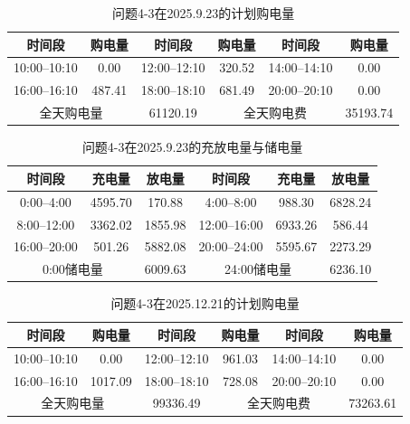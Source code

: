 \documentclass[UTF8]{ctexart}
\begin{document}
    \begin{table}[htbp]
        \centering
        \caption{问题4-3在2025.9.23的计划购电量}
        \label{tab:q43_tenminute_0923}
        \begin{tabular}{cccccc}
            \toprule
            时间段 & 购电量 & 时间段 & 购电量 & 时间段 & 购电量 \\
            \midrule
            10:00--10:10 & 0.00 & 12:00--12:10 & 320.52 & 14:00--14:10 & 0.00 \\
            16:00--16:10 & 487.41 & 18:00--18:10 & 681.49 & 20:00--20:10 & 0.00 \\
            \midrule
            \multicolumn{2}{c}{全天购电量} & 61120.19 &
            \multicolumn{2}{c}{全天购电费} & 35193.74 \\
            \bottomrule
        \end{tabular}
    \end{table}
    
    \begin{table}[htbp]
        \centering
        \caption{问题4-3在2025.9.23的充放电量与储电量}
        \label{tab:q43_battery_0923}
        \begin{tabular}{cccccc}
            \toprule
            时间段 & 充电量 & 放电量 & 时间段 & 充电量 & 放电量 \\
            \midrule
            0:00--4:00 & 4595.70 & 170.88 & 4:00--8:00 & 988.30 & 6828.24 \\
            8:00--12:00 & 3362.02 & 1855.98 & 12:00--16:00 & 6933.26 & 586.44 \\
            16:00--20:00 & 501.26 & 5882.08 & 20:00--24:00 & 5595.67 & 2273.29 \\
            \midrule
            \multicolumn{2}{c}{0:00储电量} & 6009.63 &
            \multicolumn{2}{c}{24:00储电量} & 6236.10 \\
            \bottomrule
        \end{tabular}
    \end{table}
    
    \begin{table}[htbp]
        \centering
        \caption{问题4-3在2025.12.21的计划购电量}
        \label{tab:q43_tenminute_1221}
        \begin{tabular}{cccccc}
            \toprule
            时间段 & 购电量 & 时间段 & 购电量 & 时间段 & 购电量 \\
            \midrule
            10:00--10:10 & 0.00 & 12:00--12:10 & 961.03 & 14:00--14:10 & 0.00 \\
            16:00--16:10 & 1017.09 & 18:00--18:10 & 728.08 & 20:00--20:10 & 0.00 \\
            \midrule
            \multicolumn{2}{c}{全天购电量} & 99336.49 &
            \multicolumn{2}{c}{全天购电费} & 73263.61 \\
            \bottomrule
        \end{tabular}
    \end{table}
    
\end{document}
